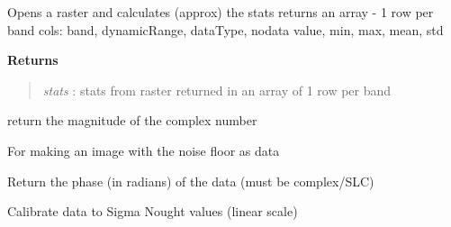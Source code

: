 \documentclass[letterpaper,10pt,openany,oneside]{sphinxmanual}
\begin{document}
\begin{fulllineitems}
\begin{fulllineitems}
\end{fulllineitems}


\begin{fulllineitems}
\label{code:Image.Image.getImgStats}
Opens a raster and calculates (approx) the stats
returns an array - 1 row per band
cols: band, dynamicRange, dataType, nodata value, min, max, mean, std

\textbf{Returns}
\begin{quote}

\emph{stats} : stats from raster returned in an array of 1 row per band
\end{quote}

\end{fulllineitems}


\begin{fulllineitems}
\label{code:Image.Image.getMag}
return the magnitude of the complex number

\end{fulllineitems}


\begin{fulllineitems}
\label{code:Image.Image.getNoise}
For making an image with the noise floor as data

\end{fulllineitems}


\begin{fulllineitems}
\label{code:Image.Image.getPhase}
Return the phase (in radians) of the data (must be complex/SLC)

\end{fulllineitems}


\begin{fulllineitems}
\label{code:Image.Image.getSigma}
Calibrate data to Sigma Nought values (linear scale)


\end{fulllineitems}
\end{fulllineitems}
\end{document}
